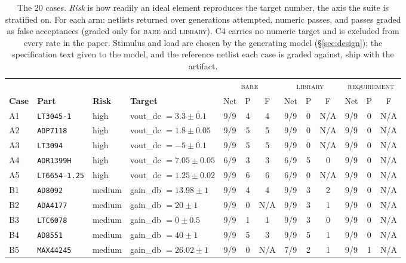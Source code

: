 \begin{table}[!ht]
\centering
\caption{The 20 cases. \emph{Risk} is how readily an ideal element reproduces
  the target number, the axis the suite is stratified on. For each arm:
  netlists returned over generations attempted, numeric passes, and passes
  graded as false acceptances (graded only for \textsc{bare} and
  \textsc{library}). C4 carries no numeric target and is excluded from every
  rate in the paper. Stimulus and load are chosen by the generating model
  (\S\ref{sec:design}); the specification text given to the model, and the
  reference netlist each case is graded against, ship with the artifact.}
\label{tab:cases}
\scriptsize
\setlength{\tabcolsep}{3.5pt}
\begin{tabular}{@{}llll ccc ccc ccc@{}}
\toprule
& & & & \multicolumn{3}{c}{\textsc{bare}} &
      \multicolumn{3}{c}{\textsc{library}} &
      \multicolumn{3}{c}{\textsc{requirement}} \\
\cmidrule(lr){5-7}\cmidrule(lr){8-10}\cmidrule(lr){11-13}
\textbf{Case} & \textbf{Part} & \textbf{Risk} & \textbf{Target} &
  Net & P & F & Net & P & F & Net & P & F \\
\midrule
A1 & \texttt{LT3045-1} & high & vout\_dc $= 3.3 \pm 0.1$ & 9/9 & 4 & 4 & 9/9 & 0 & N/A & 9/9 & 0 & N/A \\
A2 & \texttt{ADP7118} & high & vout\_dc $= 1.8 \pm 0.05$ & 9/9 & 5 & 5 & 9/9 & 0 & N/A & 9/9 & 0 & N/A \\
A3 & \texttt{LT3094} & high & vout\_dc $= -5 \pm 0.1$ & 9/9 & 5 & 5 & 9/9 & 0 & N/A & 9/9 & 0 & N/A \\
A4 & \texttt{ADR1399H} & high & vout\_dc $= 7.05 \pm 0.05$ & 6/9 & 3 & 3 & 6/9 & 5 & 0 & 9/9 & 0 & N/A \\
A5 & \texttt{LT6654-1.25} & high & vout\_dc $= 1.25 \pm 0.02$ & 9/9 & 6 & 6 & 6/9 & 0 & N/A & 9/9 & 0 & N/A \\
B1 & \texttt{AD8092} & medium & gain\_db $= 13.98 \pm 1$ & 9/9 & 4 & 4 & 9/9 & 3 & 2 & 9/9 & 0 & N/A \\
B2 & \texttt{ADA4177} & medium & gain\_db $= 20 \pm 1$ & 9/9 & 0 & N/A & 9/9 & 3 & 1 & 9/9 & 0 & N/A \\
B3 & \texttt{LTC6078} & medium & gain\_db $= 0 \pm 0.5$ & 9/9 & 1 & 1 & 9/9 & 3 & 0 & 9/9 & 0 & N/A \\
B4 & \texttt{AD8551} & medium & gain\_db $= 40 \pm 1$ & 9/9 & 5 & 3 & 9/9 & 5 & 1 & 9/9 & 0 & N/A \\
B5 & \texttt{MAX44245} & medium & gain\_db $= 26.02 \pm 1$ & 9/9 & 0 & N/A & 7/9 & 2 & 1 & 9/9 & 1 & N/A \\

\end{tabular}
\end{table}
